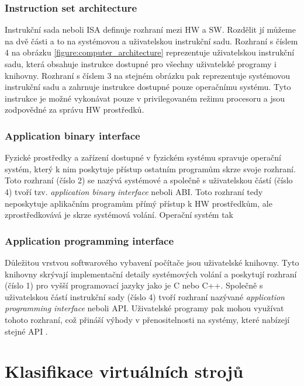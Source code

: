     \subsubsection*{Instruction set architecture}
    \label{subsubsection:isa}
    
    Instrukční sada neboli ISA definuje rozhraní mezi HW a SW. Rozdělit jí můžeme na dvě části a to na systémovou a uživatelskou instrukční sadu. Rozhraní s číslem 4 na obrázku \ref{figure:computer_architecture}
    reprezentuje uživatelskou instrukční sadu, která obsahuje instrukce dostupné pro všechny uživatelské programy i knihovny. Rozhraní s číslem 3 na stejném obrázku pak reprezentuje systémovou instrukční sadu a zahrnuje
    instrukce dostupné pouze operačnímu systému. Tyto instrukce je možné vykonávat pouze v privilegovaném režimu procesoru a jsou zodpovědné za správu HW prostředků.

    \subsubsection*{Application binary interface}
    \label{subsubsection:abi}
    
    Fyzické prostředky a zařízení dostupné v fyzickém systému spravuje operační systém, který k nim poskytuje přístup ostatním programům skrze svoje rozhraní. Toto rozhraní (číslo 2) se nazývá systémové a společně s uživatelskou
    částí (číslo 4) tvoří tzv. \textit{application binary interface} neboli ABI. Toto rozhraní tedy neposkytuje aplikačním programům přímý přístup k HW prostředkům, ale zprostředkovává je skrze systémová volání.
    Operační systém tak 

    \subsubsection*{Application programming interface}
    \label{subsubsection:api}
    
    Důležitou vrstvou softwarového vybavení počítače jsou uživatelské knihovny. Tyto knihovny skrývají implementační detaily systémových volání a poskytují rozhraní (číslo 1) pro vyšší programovací jazyky
    jako je C nebo C++. Společně s uživatelskou částí instrukční sady (číslo 4) tvoří rozhraní nazývané \textit{application programming interface} neboli API. Uživatelské programy pak mohou využívat tohoto rozhraní,
    což přináší výhody v přenositelnosti na systémy, které nabízejí stejné API .

\section{Klasifikace virtuálních strojů}
\label{section:clasification}

